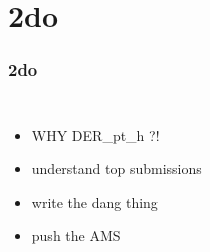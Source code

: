 \section{2do}
	\begin{frame}
	\frametitle{2do}
		\begin{columns}
			\centering
			\begin{itemize}[<+->]
				\item WHY DER\_pt\_h ?!
				\item understand top submissions
				\item write the dang thing
				\item push the AMS
			\end{itemize}
		\end{columns}		
	\end{frame}